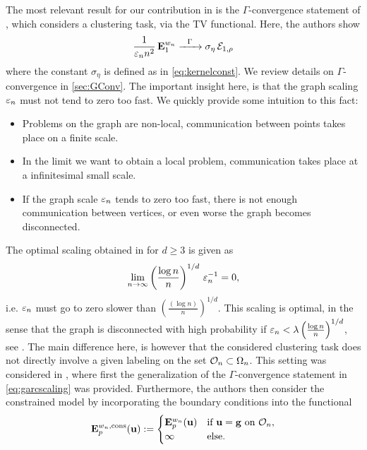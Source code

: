 The most relevant result for our contribution in \cite{roith2022continuum} is the $\Gamma$-convergence statement of \cite{GarcSlep15}, which considers a clustering task, via the TV functional. Here, the authors show 
%
\begin{align*}
\frac{1}{\varepsilon_n n^2}\, \mathbf{E}^{w_n}_1 \xrightarrow{\phantom{-}\Gamma\phantom{-}} \sigma_\eta\, \mathcal{E}_{1,\rho}
\end{align*}
%
where the constant $\sigma_\eta$ is defined as in \cref{eq:kernelconst}. We review details on $\Gamma$-convergence in \cref{sec:GConv}. The important insight here, is that the graph scaling $\varepsilon_n$ must not tend to zero too fast. We quickly provide some intuition to this fact:
%
\begin{itemize}
	\item Problems on the graph are non-local, communication between points takes place on a finite scale.
	\item In the limit we want to obtain a local problem, communication takes place at a infinitesimal small scale.
	\item If the graph scale $\varepsilon_n$ tends to zero too fast, there is not enough communication between vertices, or even worse the graph becomes disconnected.
\end{itemize}
%
The optimal scaling obtained in \cite{GarcSlep15} for $d\geq 3$ is given as 
%
\begin{align}\label{eq:garcscaling}
\lim_{n\to\infty} \left(\frac{\log n}{n}\right)^{1/d}\, \varepsilon_n^{-1} = 0,
\end{align}
%
i.e. $\varepsilon_n$ must go to zero slower than $\left(\frac{(\log n)}{n}\right)^{1/d}$. This scaling is optimal, in the sense that the graph is disconnected with high probability if $\varepsilon_n < \lambda \left(\frac{\log n}{n}\right)^{1/d}$, see \cite{GarcSlep15}. The main difference here, is however that the considered clustering task does not directly involve a given labeling on the set $\mathcal{O}_n\subset\Omega_n$. This setting was considered in \cite{slepcev2019analysis}, where first the generalization of the $\Gamma$-convergence statement in \cref{eq:garcscaling} was provided. Furthermore, the authors then consider the constrained  model by incorporating the boundary conditions into the functional
%
\begin{align*}
\mathbf{E}^{w_n, \text{cons}}_p(\mathbf{u}) :=
\begin{cases}
\mathbf{E}^{w_n}_p(\mathbf{u}) &\text{if } \mathbf{u} = \mathbf{g} \text{ on }\mathcal{O}_n,\\
\infty &\text{else}.
\end{cases} 
\end{align*}
